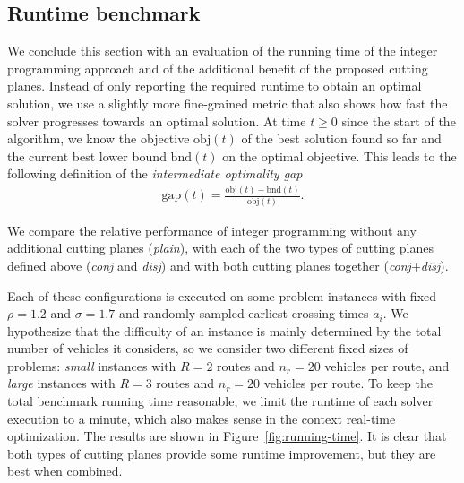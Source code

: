 \documentclass{report}
\theoremstyle{definition}
\theoremstyle{plain}
\begin{document}
\subsection{Runtime benchmark}\label{sec:runtime-bench}

We conclude this section with an evaluation of the running time of the integer
programming approach and of the additional benefit of the proposed cutting
planes.
%
Instead of only reporting the required runtime to obtain an optimal solution, we
use a slightly more fine-grained metric that also shows how fast the solver
progresses towards an optimal solution.
%
At time $t \geq 0$ since the start of the algorithm, we know the objective
$\mathrm{obj}(t)$ of the best solution found so far and the current best lower
bound $\mathrm{bnd}(t)$ on the optimal objective.
%
This leads to the following definition of the \emph{intermediate optimality gap}
\begin{align}
  \mathrm{gap}(t) = \frac{\mathrm{obj}(t) - \mathrm{bnd}(t)}{\mathrm{obj}(t)} .
\end{align}

We compare the relative performance of integer programming without any
additional cutting planes (\emph{plain}), with each of the two types of cutting
planes defined above (\emph{conj} and \emph{disj}) and with both cutting planes
together (\emph{conj}+\emph{disj}).

Each of these configurations is executed on some problem instances with fixed
$\rho=1.2$ and $\sigma=1.7$ and randomly sampled earliest crossing times $a_i$.
%
We hypothesize that the difficulty of an instance is mainly determined by the
total number of vehicles it considers, so we consider two different fixed sizes
of problems: \emph{small} instances with $R=2$ routes and $n_r = 20$ vehicles
per route, and \emph{large} instances with $R=3$ routes and $n_r = 20$ vehicles
per route.
%
To keep the total benchmark running time reasonable, we limit the runtime of
each solver execution to a minute, which also makes sense in the context
real-time optimization.
%
The results are shown in Figure~\ref{fig:running-time}.
It is clear that both types of cutting planes provide some runtime improvement, but they are best when combined.
\end{document}
